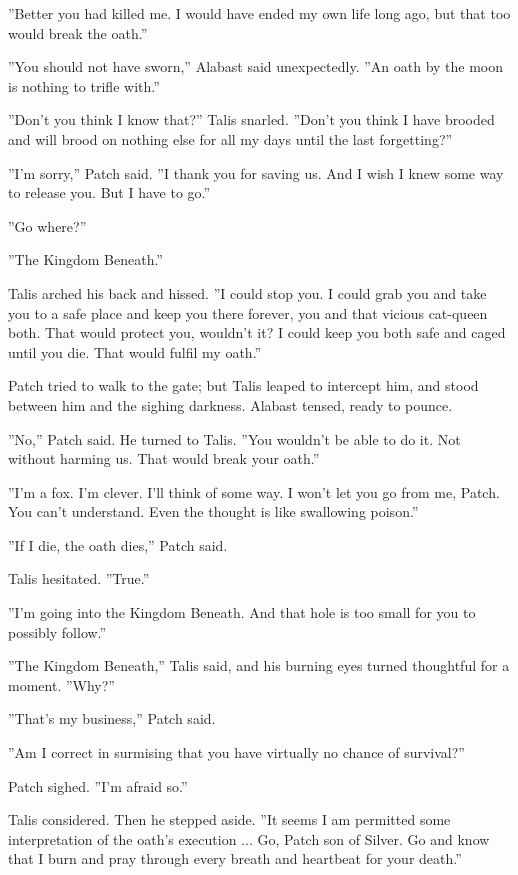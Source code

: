 \documentclass[12pt]{book}
\begin{document}
''Better you had killed me. I would have ended my own life long ago, but that too would break the oath.''

''You should not have sworn,'' Alabast said unexpectedly. ''An oath by the moon is nothing to trifle with.''

''Don't you think I know that?'' Talis snarled. ''Don't you think I have brooded and will brood on nothing else for all my days until the last forgetting?''

''I'm sorry,'' Patch said. ''I thank you for saving us. And I wish I knew some way to release you. But I have to go.''

''Go where?''

''The Kingdom Beneath.''

Talis arched his back and hissed. ''I could stop you. I could grab you and take you to a safe place and keep you there forever, you and that vicious cat-queen both. That would protect you, wouldn't it? I could keep you both safe and caged until you die. That would fulfil my oath.''

Patch tried to walk to the gate; but Talis leaped to intercept him, and stood between him and the sighing darkness. Alabast tensed, ready to pounce.

''No,'' Patch said. He turned to Talis. ''You wouldn't be able to do it. Not without harming us. That would break your oath.''

''I'm a fox. I'm clever. I'll think of some way. I won't let you go from me, Patch. You can't understand. Even the thought is like swallowing poison.''

''If I die, the oath dies,'' Patch said.

Talis hesitated. ''True.''

''I'm going into the Kingdom Beneath. And that hole is too small for you to possibly follow.''

''The Kingdom Beneath,'' Talis said, and his burning eyes turned thoughtful for a moment. ''Why?''

''That's my business,'' Patch said.

''Am I correct in surmising that you have virtually no chance of survival?''

Patch sighed. ''I'm afraid so.''

Talis considered. Then he stepped aside. ''It seems I am permitted some interpretation of the oath's execution ... Go, Patch son of Silver. Go and know that I burn and pray through every breath and heartbeat for your death.''
\end{document}
